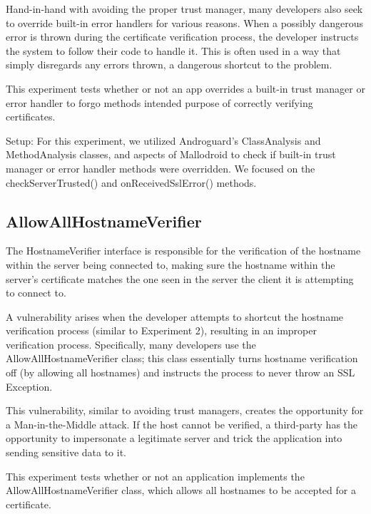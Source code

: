        Hand-in-hand with avoiding the proper trust manager, many developers also seek to override built-in error handlers for various reasons. 
        When a possibly dangerous error is thrown during the certificate verification process, the developer instructs the system to follow their code to handle it. This is often used in a way that simply disregards any errors thrown, a dangerous shortcut to the problem.

        This experiment tests whether or not an app overrides a built-in
        trust manager or error handler to forgo methods intended purpose of
        correctly verifying certificates.

        Setup: For this experiment, we utilized Androguard's ClassAnalysis and 
        MethodAnalysis classes, and aspects of Mallodroid to
        check if built-in trust manager or error handler methods were overridden. 
        We focused on the checkServerTrusted() and onReceivedSslError() methods. 

    \subsection{AllowAllHostnameVerifier}
    
        The HostnameVerifier interface is responsible for the 
        verification of the hostname within the server being connected to, making 
        sure the hostname within the server's certificate matches the one 
        seen in the server the client it is attempting to connect to. 

        A vulnerability arises when the developer attempts to shortcut the 
        hostname verification process (similar to Experiment 2), resulting 
        in an improper verification process. Specifically, many 
        developers use the AllowAllHostnameVerifier class; this class 
        essentially turns hostname verification off (by allowing all 
        hostnames) and instructs the process to never throw an SSL 
        Exception.

        This vulnerability, similar to avoiding trust managers, creates 
        the opportunity for a Man-in-the-Middle attack. If the host 
        cannot be verified, a third-party has the opportunity to impersonate
        a legitimate server and trick the application into sending 
        sensitive data to it.

        This experiment tests whether or not an application 
        implements the AllowAllHostnameVerifier class, which allows 
        all hostnames to be accepted for a certificate.

